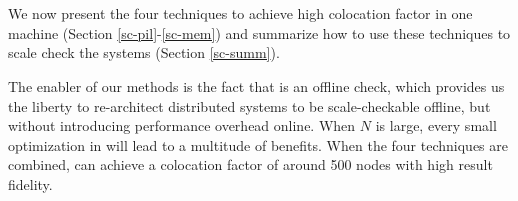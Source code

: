 \section{\sck}
\label{sec-sck-sck}

We now present the four \sck techniques to achieve high colocation factor in
one machine (Section \ref{sc-pil}-\ref{sc-mem}) and summarize how to use these
techniques to scale check the systems (Section \ref{sc-summ}).

The enabler of our methods is the fact that \sck is an offline check, which
provides us the liberty to re-architect distributed systems to be
scale-checkable offline, but without introducing performance overhead online.
%
When $N$ is large, every small optimization in \sck will lead to a multitude of
benefits.
%
When the four techniques are combined, \sck can achieve a colocation factor of
around 500 nodes with high result fidelity.





